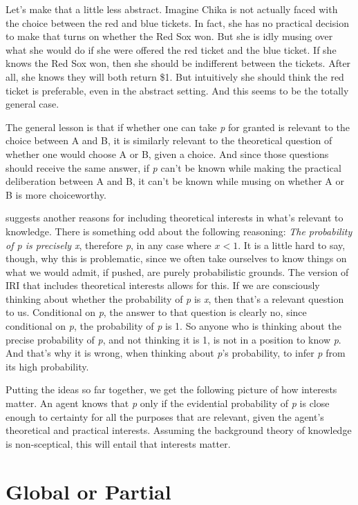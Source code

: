 Let's make that a little less abstract. Imagine Chika is not actually faced with the choice between the red and blue tickets. In fact, she has no practical decision to make that turns on whether the Red Sox won. But she is idly musing over what she would do if she were offered the red ticket and the blue ticket. If she knows the Red Sox won, then she should be indifferent between the tickets. After all, she knows they will both return \$1. But intuitively she should think the red ticket is preferable, even in the abstract setting. And this seems to be the totally general case.

The general lesson is that if whether one can take \emph{p} for granted is relevant to the choice between A and B, it is similarly relevant to the theoretical question of whether one would choose A or B, given a choice. And since those questions should receive the same answer, if \emph{p} can't be known while making the practical deliberation between A and B, it can't be known while musing on whether A or B is more choiceworthy. 

 \citet{Weatherson2012} suggests another reasons for including theoretical interests in what's relevant to knowledge. There is something odd about the following reasoning: \emph{The probability of p is precisely x}, therefore \emph{p}, in any case where $x < 1$. It is a little hard to say, though, why this is problematic, since we often take ourselves to know things on what we would admit, if pushed, are purely probabilistic grounds. The version of IRI that includes theoretical interests allows for this. If we are consciously thinking about whether the probability of \emph{p} is \emph{x}, then that's a relevant question to us. Conditional on \emph{p}, the answer to that question is clearly no, since conditional on \emph{p}, the probability of \emph{p} is 1. So anyone who is thinking about the precise probability of \emph{p}, and not thinking it is 1, is not in a position to know \emph{p}. And that's why it is wrong, when thinking about \emph{p}'s probability, to infer \emph{p} from its high probability.

Putting the ideas so far together, we get the following picture of how interests matter. An agent knows that \emph{p} only if the evidential probability of \emph{p} is close enough to certainty for all the purposes that are relevant, given the agent's theoretical and practical interests. Assuming the background theory of knowledge is non-sceptical, this will entail that interests matter.

\section{Global or Partial}
\label{globalorpartial}

